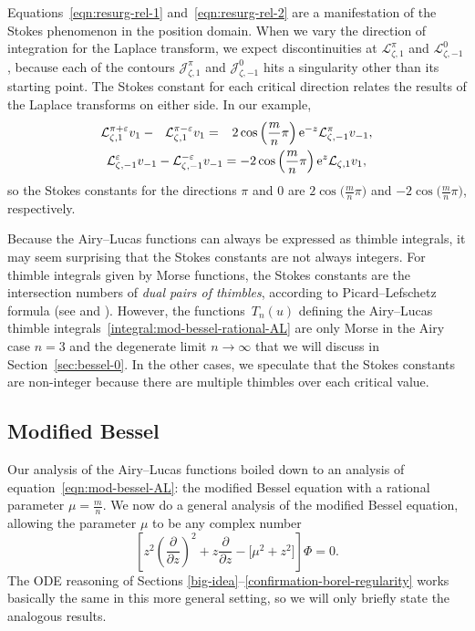 \documentclass[10pt,a4paper]{amsart}
\newcommand{\laplace}{\mathcal{L}}
\numberwithin{equation}{section}
\begin{document}
Equations~\eqref{eqn:resurg-rel-1} and~\eqref{eqn:resurg-rel-2} are a manifestation of the Stokes phenomenon in the position domain. When we vary the direction of integration for the Laplace transform, we expect discontinuities at $\laplace^\pi_{\zeta,1}$ and $\laplace^0_{\zeta,-1}$, because each of the contours $\mathcal{J}^\pi_{\zeta,1}$ and $\mathcal{J}^0_{\zeta,-1}$ hits a singularity other than its starting point. The Stokes constant for each critical direction relates the results of the Laplace transforms on either side. In our example,
\begin{gather*}
\laplace_{\zeta,1}^{\pi+\varepsilon} v_1 - \hphantom{{}_{-}}\laplace_{\zeta,1}^{\pi-\varepsilon} v_1 = \hphantom{-}2\cos\left(\frac{m}{n}\pi\right) {\rm e}^{-z} \laplace_{\zeta,-1}^{\pi} v_{-1}, \\
\laplace_{\zeta,-1}^{\varepsilon} v_{-1} - \laplace_{\zeta,-1}^{-\varepsilon} v_{-1} = -2\cos\left(\frac{m}{n}\pi\right) {\rm e}^z \laplace_{\zeta,1} v_{1},
\end{gather*}
so the Stokes constants for the directions $\pi$ and $0$ are $2\cos\bigl(\frac{m}{n}\pi\bigr)$ and $-2\cos\bigl(\frac{m}{n}\pi\bigr)$, respectively.

Because the Airy--Lucas functions can always be expressed as thimble integrals, it may seem surprising that the Stokes constants are not always integers. For thimble integrals given by Morse functions, the Stokes constants are the intersection numbers of \textit{dual pairs of thimbles}, according to Picard--Lefschetz formula (see \cite[Section~5]{pham} and \cite[Chapter~1]{Arnold}). However, the functions~$T_n(u)$ defining the Airy--Lucas thimble integrals~\eqref{integral:mod-bessel-rational-AL} are only Morse in the Airy case $n = 3$ and the degenerate limit $n \to \infty$ that we will discuss in Section~\ref{sec:bessel-0}. In the other cases, we speculate that the Stokes constants are non-integer because there are multiple thimbles over each critical value.
\subsection{Modified Bessel}\label{sec:mod-bessel-lift}
Our analysis of the Airy--Lucas functions boiled down to an analysis of equation~\eqref{eqn:mod-bessel-AL}: the modified Bessel equation with a rational parameter $\mu = \frac{m}{n}$. We now do a general analysis of the modified Bessel equation, allowing the parameter $\mu$ to be any complex number
\begin{equation}\label{eqn:mod-bessel}
\left[z^2 \left(\frac{\partial}{\partial z}\right)^2 + z \frac{\partial}{\partial z} - \bigl[\mu^2 + z^2\bigr]\right] \Phi = 0.
\end{equation}
The ODE reasoning of Sections \ref{big-idea}--\ref{confirmation-borel-regularity} works basically the same in this more general setting, so we will only briefly state the analogous results.
\end{document}
